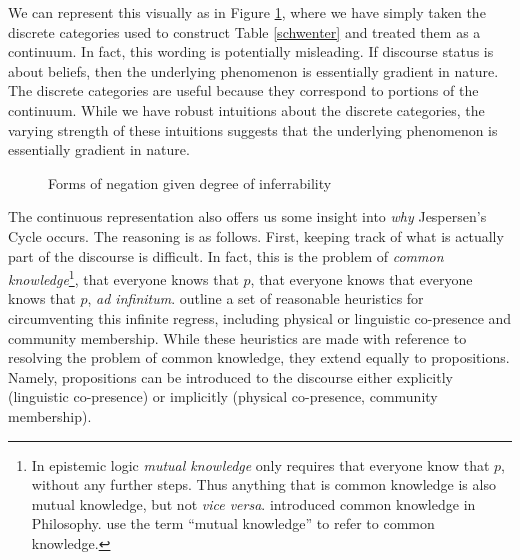 We can represent this visually as in Figure \ref{continuum}, where we have simply taken the discrete categories used to construct Table \ref{schwenter} and treated them as a continuum. In fact, this wording is potentially misleading. If discourse status is about beliefs, then the underlying phenomenon is essentially gradient in nature. The discrete categories are useful because they correspond to portions of the continuum. While we have robust intuitions about the discrete categories, the varying strength of these intuitions suggests that the underlying phenomenon is essentially gradient in nature.

\begin{figure}
     \begin{center}
\end{center}
  \caption{Forms of negation given degree of inferrability}
  \label{continuum}
\end{figure}



The continuous representation also offers us some insight into \emph{why} Jespersen's Cycle occurs. The reasoning is as follows. First, keeping track of what is actually part of the discourse is difficult. In fact, this is the problem of \emph{common knowledge}\footnote{In epistemic logic \emph{mutual knowledge} only requires that everyone know that $p$, without any further steps. Thus anything that is common knowledge is also mutual knowledge, but not \emph{vice versa}. \cite{lewis:1969} introduced common knowledge in Philosophy. \cite{clark-marshall1981} use the term ``mutual knowledge'' to refer to common knowledge.}, that everyone knows that $p$, that everyone knows that everyone knows that $p$, \emph{ad infinitum}. \cite{clark-marshall1981} outline a set of reasonable heuristics for circumventing this infinite regress, including physical or linguistic co-presence and community membership. While these heuristics are made with reference to resolving the problem of common knowledge, they extend equally to 
propositions. Namely, propositions can be introduced to the discourse either explicitly (linguistic co-presence) or implicitly (physical co-presence, community membership).

